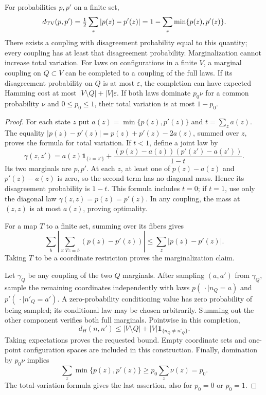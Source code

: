 \begin{lemma}\label{l:finitecoupling}
For probabilities \(p,p'\) on a finite set,
\[
 d_{\rm TV}(p,p')=\tfrac12\sum_z|p(z)-p'(z)|
          =1-\sum_z\min\{p(z),p'(z)\}.
\]
There exists a coupling with disagreement probability equal to this
quantity; every coupling has at least that disagreement probability.
Marginalization cannot increase total variation.
For laws on configurations in a finite \(V\), a marginal coupling
on \(Q\subset V\) can be completed to a coupling of the full laws.
If its disagreement probability on \(Q\) is at most \(\varepsilon\),
the completion can have expected Hamming cost at most
\(|V\setminus Q|+|V|\varepsilon\).
If both laws dominate \(p_0\nu\) for a common probability \(\nu\)
and \(0\le p_0\le1\), their total variation is at most \(1-p_0\).
\end{lemma}

\begin{proof}
For each state \(z\) put \(a(z)=\min\{p(z),p'(z)\}\) and
\(t=\sum_z a(z)\).  The equality
\(|p(z)-p'(z)|=p(z)+p'(z)-2a(z)\), summed over \(z\), proves
the formula for total variation.  If \(t<1\), define a joint law by
\[
 \gamma(z,z')=a(z)\mathbf1_{\{z=z'\}}
       +\frac{(p(z)-a(z))(p'(z')-a(z'))}{1-t}.
\]
Its two marginals are \(p,p'\).  At each \(z\), at least one of
\(p(z)-a(z)\) and \(p'(z)-a(z)\) is zero, so the second term
has no diagonal mass.  Hence its disagreement probability is \(1-t\).
This formula includes \(t=0\); if \(t=1\), use only the diagonal
law \(\gamma(z,z)=p(z)=p'(z)\).  In any coupling, the mass at
\((z,z)\) is at most \(a(z)\), proving optimality.

For a map \(T\) to a finite set, summing over its fibers gives
\[
 \sum_b\left|\sum_{z:Tz=b}(p(z)-p'(z))\right|
       \le\sum_z|p(z)-p'(z)|.
\]
Taking \(T\) to be a coordinate restriction proves the marginalization
claim.

Let \(\gamma_Q\) be any coupling of the two \(Q\) marginals.
After sampling \((a,a')\) from \(\gamma_Q\), sample the remaining
coordinates independently with laws
\(p(\,\cdot\mid n_Q=a)\) and \(p'(\,\cdot\mid n'_Q=a')\).
A zero-probability conditioning value has zero probability of being
sampled; its conditional law may be chosen arbitrarily.  Summing out
the other component verifies both full marginals.  Pointwise in this
completion,
\[
 d_H(n,n')\le |V\setminus Q|
                      +|V|\mathbf1_{\{n_Q\ne n'_Q\}}.
\]
Taking expectations proves the requested bound.  Empty coordinate sets
and one-point configuration spaces are included in this construction.
Finally, domination by \(p_0\nu\) implies
\[
 \sum_z\min\{p(z),p'(z)\}\ge p_0\sum_z\nu(z)=p_0.
\]
The total-variation formula gives the last assertion, also for
\(p_0=0\) or \(p_0=1\).
\end{proof}

